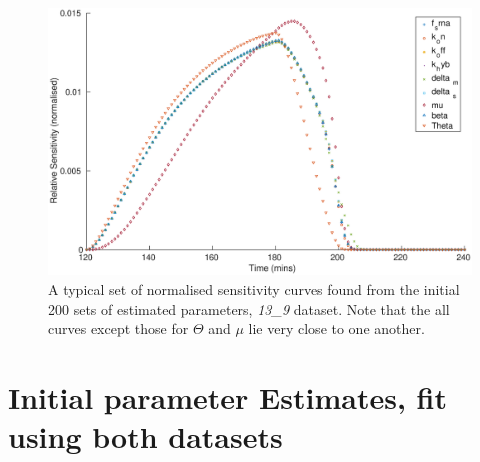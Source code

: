 \documentclass[10pt,journal]{./IEEE_latex_class/IEEEtran}
\begin{document}
\begin{figure}[h]
    \centering
        \includegraphics[scale = 0.35, clip = true, trim = 0 0 0 0]{Sensitivty_scaled_other}
        \caption{A typical set of normalised sensitivity curves found from the initial 200 sets of estimated parameters, \textit{13\_9} dataset. Note that the all curves except those for $\Theta$ and $\mu$ lie very close to one another.}
        \label{Sensitivity_scaled_other}
    \end{figure}

\clearpage

\section{Initial parameter Estimates, fit using both datasets}
\label{Bothdatasetfitting}
\setcounter{figure}{0} 
\end{document}
